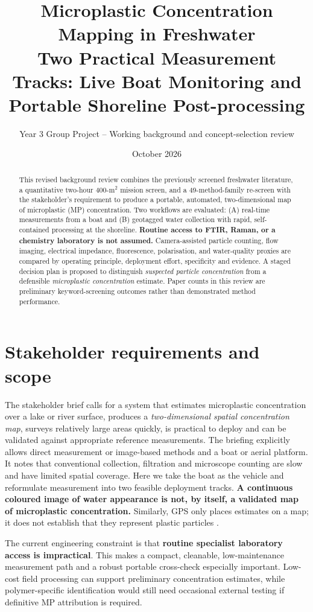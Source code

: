 \documentclass[10pt,a4paper]{article}
\title{\color{mpblue}\bfseries Microplastic Concentration Mapping in Freshwater\\[4pt]
\large Two Practical Measurement Tracks: Live Boat Monitoring and Portable Shoreline Post-processing}
\author{Year 3 Group Project -- Working background and concept-selection review}
\date{October 2026}
\begin{document}
\maketitle
\begin{abstract}
This revised background review combines the previously screened freshwater literature, a quantitative two-hour 400-m$^2$ mission screen, and a 49-method-family re-screen with the stakeholder's requirement to produce a portable, automated, two-dimensional map of microplastic (MP) concentration. Two workflows are evaluated: (A) real-time measurements from a boat and (B) geotagged water collection with rapid, self-contained processing at the shoreline. \textbf{Routine access to FTIR, Raman, or a chemistry laboratory is not assumed.} Camera-assisted particle counting, flow imaging, electrical impedance, fluorescence, polarisation, and water-quality proxies are compared by operating principle, deployment effort, specificity and evidence. A staged decision plan is proposed to distinguish \emph{suspected particle concentration} from a defensible \emph{microplastic concentration} estimate. Paper counts in this review are preliminary keyword-screening outcomes rather than demonstrated method performance.
\end{abstract}

\section{Stakeholder requirements and scope}
The stakeholder brief calls for a system that estimates microplastic concentration over a lake or river surface, produces a \emph{two-dimensional spatial concentration map}, surveys relatively large areas quickly, is practical to deploy and can be validated against appropriate reference measurements. The briefing explicitly allows direct measurement or image-based methods and a boat or aerial platform. It notes that conventional collection, filtration and microscope counting are slow and have limited spatial coverage. Here we take the boat as the vehicle and reformulate measurement into two feasible deployment tracks. \textbf{A continuous coloured image of water appearance is not, by itself, a validated map of microplastic concentration.} Similarly, GPS only places estimates on a map; it does not establish that they represent plastic particles \cite{Chen2021,Chen2023,Blevins2021}.

The current engineering constraint is that \textbf{routine specialist laboratory access is impractical}. This makes a compact, cleanable, low-maintenance measurement path and a robust portable cross-check especially important. Low-cost field processing can support preliminary concentration estimates, while polymer-specific identification would still need occasional external testing if definitive MP attribution is required.
\end{document}
